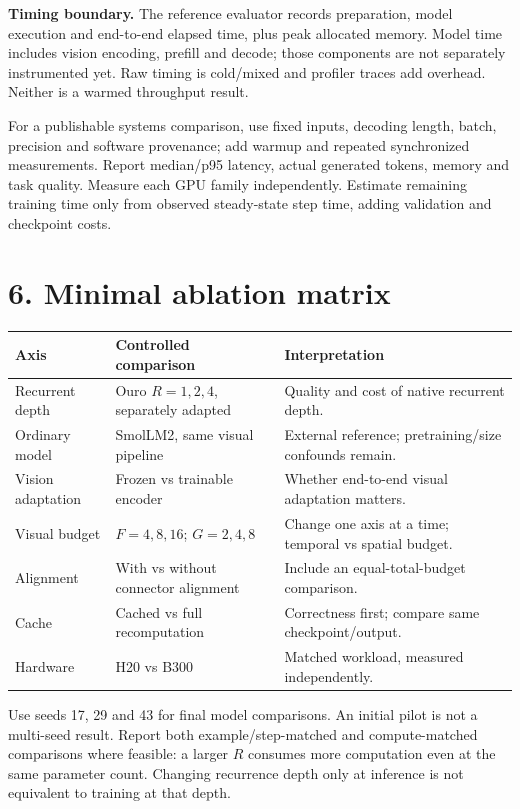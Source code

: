 \documentclass[10pt]{article}
\begin{document}
\textbf{Timing boundary.} The reference evaluator records preparation, model execution and end-to-end elapsed time, plus peak allocated memory. Model time includes vision encoding, prefill and decode; those components are not separately instrumented yet. Raw timing is cold/mixed and profiler traces add overhead. Neither is a warmed throughput result.

For a publishable systems comparison, use fixed inputs, decoding length, batch, precision and software provenance; add warmup and repeated synchronized measurements. Report median/p95 latency, actual generated tokens, memory and task quality. Measure each GPU family independently. Estimate remaining training time only from observed steady-state step time, adding validation and checkpoint costs.

\clearpage
\section*{6. Minimal ablation matrix}
\begin{tabularx}{\linewidth}{@{}lYY@{}}\toprule
Axis & Controlled comparison & Interpretation\\\midrule
Recurrent depth & Ouro $R=1,2,4$, separately adapted & Quality and cost of native recurrent depth.\\
Ordinary model & SmolLM2, same visual pipeline & External reference; pretraining/size confounds remain.\\
Vision adaptation & Frozen vs trainable encoder & Whether end-to-end visual adaptation matters.\\
Visual budget & $F=4,8,16$; $G=2,4,8$ & Change one axis at a time; temporal vs spatial budget.\\
Alignment & With vs without connector alignment & Include an equal-total-budget comparison.\\
Cache & Cached vs full recomputation & Correctness first; compare same checkpoint/output.\\
Hardware & H20 vs B300 & Matched workload, measured independently.\\\bottomrule
\end{tabularx}

Use seeds 17, 29 and 43 for final model comparisons. An initial pilot is not a multi-seed result. Report both example/step-matched and compute-matched comparisons where feasible: a larger $R$ consumes more computation even at the same parameter count. Changing recurrence depth only at inference is not equivalent to training at that depth.
\end{document}
